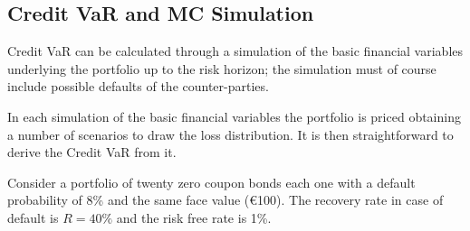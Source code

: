 \subsection{Credit VaR and MC Simulation}

Credit VaR can be calculated through a simulation of the basic financial
variables underlying the portfolio up to the risk horizon; the simulation must of course include possible defaults of the counter-parties. 

In each simulation of the basic financial variables the portfolio is priced obtaining a number of scenarios to draw the loss distribution. It is then straightforward to derive the Credit VaR from it.

Consider a portfolio of twenty zero coupon bonds each one with a default probability of 8\% and the same face value (\euro{100}). The recovery rate in case of default is $R=40\%$ and the risk free rate is 1\%.

